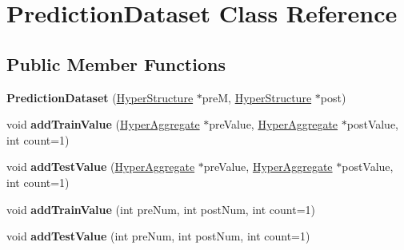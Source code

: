 \hypertarget{classPredictionDataset}{\section{Prediction\-Dataset Class Reference}
\label{classPredictionDataset}
}
\subsection*{Public Member Functions}
\begin{DoxyCompactItemize}
\item 
\hypertarget{classPredictionDataset_ab0bec076e446f0c4f38267d9f9b5ecf9}{{\bfseries Prediction\-Dataset} (\hyperlink{classHyperStructure}{Hyper\-Structure} $\ast$pre\-M, \hyperlink{classHyperStructure}{Hyper\-Structure} $\ast$post)}\label{classPredictionDataset_ab0bec076e446f0c4f38267d9f9b5ecf9}

\item 
\hypertarget{classPredictionDataset_a962c3fe3b07fd4f25771066ded8368ae}{void {\bfseries add\-Train\-Value} (\hyperlink{classHyperAggregate}{Hyper\-Aggregate} $\ast$pre\-Value, \hyperlink{classHyperAggregate}{Hyper\-Aggregate} $\ast$post\-Value, int count=1)}\label{classPredictionDataset_a962c3fe3b07fd4f25771066ded8368ae}

\item 
\hypertarget{classPredictionDataset_a2aefbe83ef0d70453159867c276439ef}{void {\bfseries add\-Test\-Value} (\hyperlink{classHyperAggregate}{Hyper\-Aggregate} $\ast$pre\-Value, \hyperlink{classHyperAggregate}{Hyper\-Aggregate} $\ast$post\-Value, int count=1)}\label{classPredictionDataset_a2aefbe83ef0d70453159867c276439ef}

\item 
\hypertarget{classPredictionDataset_a497f0627a6b80c71a3db7bd140cc0873}{void {\bfseries add\-Train\-Value} (int pre\-Num, int post\-Num, int count=1)}\label{classPredictionDataset_a497f0627a6b80c71a3db7bd140cc0873}

\item 
\hypertarget{classPredictionDataset_ad9e0f63562333d6e7a15134e3aa3894d}{void {\bfseries add\-Test\-Value} (int pre\-Num, int post\-Num, int count=1)}\label{classPredictionDataset_ad9e0f63562333d6e7a15134e3aa3894d}

\end{DoxyCompactItemize}
